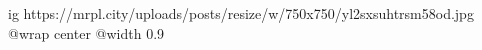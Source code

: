  
 
 
 
 

\ifcmt
  ig https://mrpl.city/uploads/posts/resize/w/750x750/yl2sxsuhtrsm58od.jpg
  @wrap center
  @width 0.9
\fi
